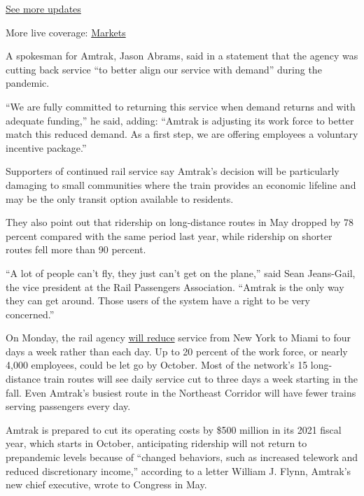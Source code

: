 \href{https://www.nytimes3xbfgragh.onion/2020/08/21/world/covid-19-coronavirus.html?action=click\&pgtype=Article\&state=default\&region=MAIN_CONTENT_1\&context=storylines_live_updates}{See
more updates}

More live coverage:
\href{https://www.nytimes3xbfgragh.onion/live/2020/08/20/business/stock-market-today-coronavirus?action=click\&pgtype=Article\&state=default\&region=MAIN_CONTENT_1\&context=storylines_live_updates}{Markets}

A spokesman for Amtrak, Jason Abrams, said in a statement that the
agency was cutting back service ``to better align our service with
demand'' during the pandemic.

``We are fully committed to returning this service when demand returns
and with adequate funding,'' he said, adding: ``Amtrak is adjusting its
work force to better match this reduced demand. As a first step, we are
offering employees a voluntary incentive package.''

Supporters of continued rail service say Amtrak's decision will be
particularly damaging to small communities where the train provides an
economic lifeline and may be the only transit option available to
residents.

They also point out that ridership on long-distance routes in May
dropped by 78 percent compared with the same period last year, while
ridership on shorter routes fell more than 90 percent.

``A lot of people can't fly, they just can't get on the plane,'' said
Sean Jeans-Gail, the vice president at the Rail Passengers Association.
``Amtrak is the only way they can get around. Those users of the system
have a right to be very concerned.''

On Monday, the rail agency
\href{https://www.usatoday.com/story/travel/2020/06/29/amtrak-reduce-new-york-florida-trains-starting-july-6/3254400001/}{will
reduce} service from New York to Miami to four days a week rather than
each day. Up to 20 percent of the work force, or nearly 4,000 employees,
could be let go by October. Most of the network's 15 long-distance train
routes will see daily service cut to three days a week starting in the
fall. Even Amtrak's busiest route in the Northeast Corridor will have
fewer trains serving passengers every day.

Amtrak is prepared to cut its operating costs by \$500 million in its
2021 fiscal year, which starts in October, anticipating ridership will
not return to prepandemic levels because of ``changed behaviors, such as
increased telework and reduced discretionary income,'' according to a
letter William J. Flynn, Amtrak's new chief executive, wrote to Congress
in May.

